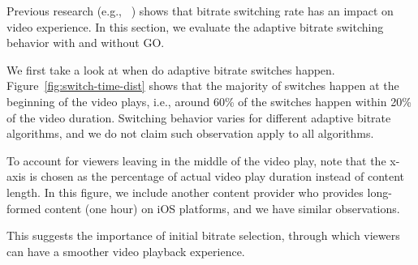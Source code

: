 \begin{figure}[h!]
\centering
{}
\hspace{-0.6cm}
\label{fig:eval-case-study}
\end{figure}



\label{subsec:adaptive-bitrate}

Previous research (e.g., ~\cite{user-adaptive,videoqoe}) shows that bitrate switching rate has an impact on video experience. In this section, we evaluate the adaptive 
bitrate switching behavior with and without GO. 

We first take a look at when do adaptive bitrate switches happen. Figure~\ref{fig:switch-time-dist} shows that the 
majority of switches happen at the beginning of the video plays, i.e., around 60\% of the switches 
happen within 20\% of the video duration. Switching behavior varies for different adaptive bitrate algorithms, and we do not 
claim such observation apply to all algorithms.

To account for viewers leaving in the middle of the video play, note that the x-axis is chosen as the percentage of actual 
video play duration instead of content length. 
In this figure, we include another content provider who provides long-formed content (one hour) on iOS platforms, and we have similar observations.

This suggests the importance of initial bitrate selection, through which viewers can have a smoother video playback experience.

